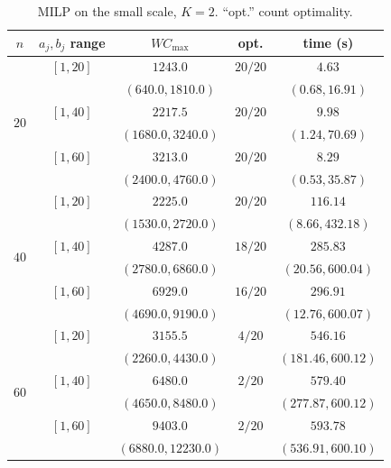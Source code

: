\documentclass[12pt]{article}
\newlength{\resultstabwidth}
\newcommand{\resultstable}{%
    \centering
    \footnotesize
    \setlength{\tabcolsep}{4pt}%
    \renewcommand{\arraystretch}{1.15}}
\begin{document}
\begin{sloppypar}
\begin{table}[H]
\resultstable
\caption{MILP on the small scale, $K=2$. ``opt.'' count optimality.}
\label{tab:results-small-milp}
\begin{tabular*}{\resultstabwidth}{@{\extracolsep{\fill}}ccccc@{}}
\toprule
$n$ & $a_j,b_j$ range & $W C_{\max}$ & opt. & time (s) \\
\midrule
\multirow{6}{*}{$20$} & $[1,20]$ & $1243.0$ & $20/20$ & $4.63$ \\
                      &          & $(640.0,1810.0)$ &       & $(0.68,16.91)$ \\
                      & $[1,40]$ & $2217.5$ & $20/20$ & $9.98$ \\
                      &          & $(1680.0,3240.0)$ &       & $(1.24,70.69)$ \\
                      & $[1,60]$ & $3213.0$ & $20/20$ & $8.29$ \\
                      &          & $(2400.0,4760.0)$ &       & $(0.53,35.87)$ \\
\midrule
\multirow{6}{*}{$40$} & $[1,20]$ & $2225.0$ & $20/20$ & $116.14$ \\
                      &          & $(1530.0,2720.0)$ &       & $(8.66,432.18)$ \\
                      & $[1,40]$ & $4287.0$ & $18/20$ & $285.83$ \\
                      &          & $(2780.0,6860.0)$ &       & $(20.56,600.04)$ \\
                      & $[1,60]$ & $6929.0$ & $16/20$ & $296.91$ \\
                      &          & $(4690.0,9190.0)$ &       & $(12.76,600.07)$ \\
\midrule
\multirow{6}{*}{$60$} & $[1,20]$ & $3155.5$ & $4/20$ & $546.16$ \\
                      &          & $(2260.0,4430.0)$ &       & $(181.46,600.12)$ \\
                      & $[1,40]$ & $6480.0$ & $2/20$ & $579.40$ \\
                      &          & $(4650.0,8480.0)$ &       & $(277.87,600.12)$ \\
                      & $[1,60]$ & $9403.0$ & $2/20$ & $593.78$ \\
                      &          & $(6880.0,12230.0)$ &       & $(536.91,600.10)$ \\
\bottomrule
\end{tabular*}
\end{table}


\end{sloppypar}
\end{document}
